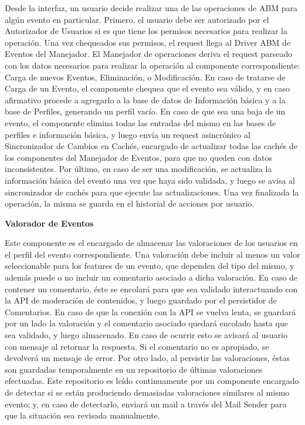 Desde la interfaz, un usuario decide realizar una de las operaciones de ABM para algún evento en particular. Primero, el usuario debe ser autorizado por el Autorizador de Usuarios si es que tiene los permisos necesarios para realizar la operación. Una vez chequeados sus permisos, el request llega al Driver ABM de Eventos del Manejador. El Manejador de operaciones deriva el request parseado con los datos necesarios para realizar la operación al componente correspondiente: Carga de nuevos Eventos, Eliminación, o Modificación.
En caso de tratarse de Carga de un Evento, el componente chequea que el evento sea válido, y en caso afirmativo procede a agregarlo a la base de datos de Información básica y a la base de Perfiles, generando un perfil vacío.
En caso de que sea una baja de un evento, el componente elimina todas las entradas del mismo en las bases de perfiles e información básica, y luego envía un request asincrónico al Sincronizador de Cambios en Cachés, encargado de actualizar todas las cachés de los componentes del Manejador de Eventos, para que no queden con datos inconsistentes.
Por último, en caso de ser una modificación, se actualiza la información básica del evento una vez que haya sido validada, y luego se avisa al sincronizador de cachés para que ejecute las actualizaciones.
Una vez finalizada la operación, la misma se guarda en el historial de acciones por usuario.

\textbf{Valorador de Eventos}

Este componente es el encargado de almacenar las valoraciones de los usuarios en el perfil del evento correspondiente. Una valoración debe incluir al menos un valor seleccionable para los features de un evento, que dependen del tipo del mismo, y además puede o no incluir un comentario asociado a dicha valoración. En caso de contener un comentario, éste se encolará para que sea validado interactuando con la API de moderación de contenidos, y luego guardado por el persistidor de Comentarios. En caso de que la conexión con la API se vuelva lenta, se guardará por un lado la valoración y el comentario asociado quedará encolado hasta que sea validado, y luego almacenado. En caso de ocurrir esto se avisará al usuario con mensaje al retornar la respuesta. Si el comentario no es apropiado, se devolverá un mensaje de error. Por otro lado, al persistir las valoraciones, éstas son guardadas temporalmente en un repositorio de últimas valoraciones efectuadas. Este repositorio es leído continuamente por un componente encargado de detectar si se están produciendo demasiadas valoraciones similares al mismo evento; y, en caso de detectarlo, enviará un mail a través del Mail Sender para que la situación sea revisada manualmente.


